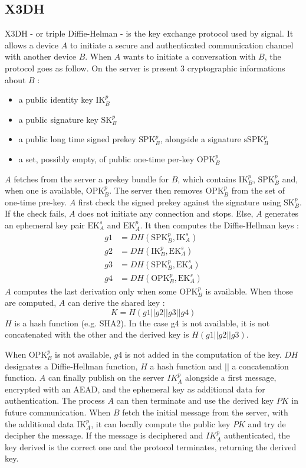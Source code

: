 \documentclass[a4paper, 10pt]{article}
\newcommand{\IK}[2]{\textrm{IK}_#1^#2}
\newcommand{\SK}[2]{\textrm{SK}_#1^#2}
\newcommand{\SPK}[2]{\textrm{SPK}_#1^#2}
\newcommand{\OPK}[2]{\textrm{OPK}_#1^#2}
\newcommand{\EK}[2]{\textrm{EK}_#1^#2}
\newcommand{\sign}[1]{\textrm{s}#1}
\begin{document}
	\subsection{X3DH}
		X3DH - or triple Diffie-Helman - is the key exchange protocol used by signal. It allows a device $A$ to initiate a secure and authenticated communication channel with another device $B$.
		When $A$ wants to initiate a conversation with $B$, the protocol goes as follow.
		On the server is present 3 cryptographic informations about $B$ :
		\begin{itemize}
			\item a public identity key $\IK{B}{p}$
			\item a public signature key $\SK{B}{p}$
			\item a public long time signed prekey $\SPK{B}{p}$, alongside a signature $\sign{\SPK{B}{p}}$
			\item a set, possibly empty, of public one-time per-key $\OPK{B}{p}$
		\end{itemize}
		$A$ fetches from the server a prekey bundle for $B$, which contains $\IK{B}{p}$, $\SPK{B}{p}$ and, when one is available, $\OPK{B}{p}$. The server then removes $\OPK{B}{p}$ from the set of one-time pre-key.
		$A$ first check the signed prekey against the signature using $\SK{B}{p}$. If the check fails, $A$ does not initiate any connection and stops.
		Else, $A$ generates an ephemeral key pair $\EK{A}{s}$ and $\EK{A}{p}$. It then computes the Diffie-Hellman keys :
		\begin{align*}
			g1 &= DH(\SPK{B}{p}, \IK{A}{s}) \\
			g2 &= DH(\IK{B}{p}, \EK{A}{s}) \\
			g3 &= DH(\SPK{B}{p}, \EK{A}{s}) \\
			g4 &= DH(\OPK{B}{p}, \EK{A}{s})
		\end{align*}
		$A$ computes the last derivation only when some $\OPK{B}{p}$ is available. When those are computed, $A$ can derive the shared key :
		\[
			K = H(g1 || g2 || g3 || g4)
		\]
		$H$ is a hash function (e.g. SHA2). In the case g4 is not available, it is not concatenated with the other and the derived key is $H(g1 || g2 || g3)$.
		
		When $\OPK{B}{p}$ is not available, $g4$ is not added in the computation of the key. $DH$ designates a Diffie-Hellman function, $H$ a hash function and $||$ a concatenation function.
		$A$ can finally publish on the server $IK_A^p$ alongside a first message, encrypted with an AEAD, and the ephemeral key as additional data for authentication. The process $A$ can then terminate and use the derived key $PK$ in future communication.
		When $B$ fetch the initial message from the server, with the additional data $\IK{A}{p}$, it can locally compute the public key $PK$ and try de decipher the message. If the message is deciphered and $IK_A^p$ authenticated, the key derived is the correct one and the protocol terminates, returning the derived key.
\end{document}
